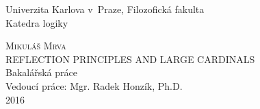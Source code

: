 \renewcommand{\theequation}{\thesection.\arabic{equation}}

\newenvironment{proof}
{\noindent \textit{Proof.}}
{\hspace*{\fill} $\Box$}

\newcommand{\toch}{\fbox{\small {\bf ??}}}
\newcommand{\bt}[1]{{\underset{\widetilde{}}{#1}}}
\newcommand{\trcl}[1]{\ensuremath{\mathrm{trcl}(\{#1\})}}
\newcommand{\cf}[1]{\ensuremath{\mathrm{cf}(#1)}}
\newcommand{\cl}[1]{\ensuremath{\mathrm{cl}}(#1)}
\newcommand{\ord}[1]{\ensuremath{\mathrm{ORD}}(#1)}
\newcommand{\dom}[1]{\ensuremath{\mathrm{dom}}(#1)}
\newcommand{\rng}[1]{\ensuremath{\mathrm{rng}}(#1)}
\newcommand{\power}[1]{\ensuremath{\mathscr{P}} (#1)}
\newcommand{\set}[2]{\ensuremath{\{#1 \,:\, #2 \}}}
\newcommand{\seq}[2]{\ensuremath{\langle #1 \,:\, #2 \rangle}}
\newcommand{\singl}[1]{\ensuremath{\{#1\}}}
\newcommand{\pair}[2]{\ensuremath{\{ #1, #2 \}}}
\newcommand{\restr}[2]{\ensuremath{#1 \! \upharpoonright \! #2}}
\renewcommand{\iff}{\leftrightarrow}
\newcommand{\Iff}{\Leftrightarrow}
\newcommand{\el}{\prec}
\newcommand{\iso}{\cong}
\newcommand{\sub}{\subseteq}
\newcommand{\super}{\supseteq}
\newcommand{\la}{\langle}
\newcommand{\ra}{\rangle}
\newcommand{\embed}{\rightarrow}
\newcommand{\mc}{\mathcal}
\newcommand{\supr}[1]{\mathrm{sup}\,#1}
\newcommand{\then}{\rightarrow}
\newcommand{\conc}{^{\smallfrown}}
\newcommand{\bb}{\mathbb}
\newcommand{\supp}[1]{\mathrm{supp}(#1)}
\newcommand{\beq}{\begin{equation}}
\newcommand{\eeq}{\end{equation}}
\newcommand{\brm}{\begin{remark}\begin{rm}}
\newcommand{\erm}{\end{rm}\end{remark}}
\newcommand{\mx}{\mathrm}
\newcommand{\bce}{\begin{compactenum}}
\newcommand{\ece}{\end{compactenum}}
\newcommand{\op}[2]{\la #1, #2 \ra}
\newcommand{\treq}{\trianglelefteq}
\newcommand{\et}{\mathrel{\&}}
\newcommand{\proves}{\vdash}
\newcommand{\bref}[1]{{\bf \ref{#1}}}
\newcommand{\eref}[1]{(\ref{#1})}


\newcommand\defeq{\mathrel{\overset{\makebox[0pt]{\mbox{\normalfont\tiny\sffamily def}}}{=}}}


\begin{titlepage}
\Large
\begin{center}
Univerzita Karlova v~Praze, Filozofick{\/á} fakulta\\
Katedra logiky

\vspace{8.5em}
\textsc{Mikuláš Mrva}\\[1.4em]
{REFLECTION PRINCIPLES AND LARGE CARDINALS}\\
Bakalářská práce\\[6.8em]
Vedoucí práce: Mgr. Radek Honzík, Ph.D.\\[6.8em]
2016
\end{center}
\end{titlepage}\


